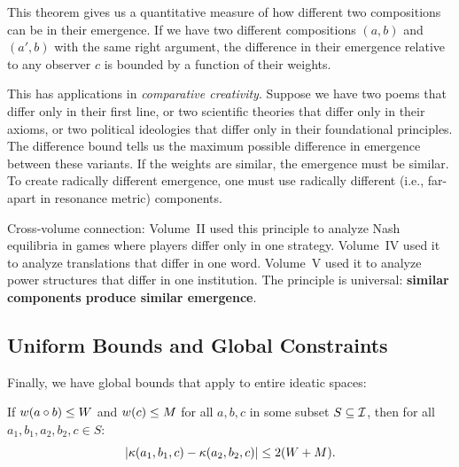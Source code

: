 \begin{interpretation}
This theorem gives us a quantitative measure of how different two compositions
can be in their emergence. If we have two different compositions $(a, b)$ and
$(a', b)$ with the same right argument, the difference in their emergence
relative to any observer $c$ is bounded by a function of their weights.

This has applications in \emph{comparative creativity}. Suppose we have two
poems that differ only in their first line, or two scientific theories that
differ only in their axioms, or two political ideologies that differ only in
their foundational principles. The difference bound tells us the maximum
possible difference in emergence between these variants. If the weights are
similar, the emergence must be similar. To create radically different
emergence, one must use radically different (i.e., far-apart in resonance
metric) components.

Cross-volume connection: Volume~II used this principle to analyze Nash
equilibria in games where players differ only in one strategy. Volume~IV used
it to analyze translations that differ in one word. Volume~V used it to
analyze power structures that differ in one institution. The principle is
universal: \textbf{similar components produce similar emergence}.
\end{interpretation}

\subsection{Uniform Bounds and Global Constraints}

Finally, we have global bounds that apply to entire ideatic spaces:

\begin{theorem}
\label{thm:uniform-bound}
If $w(a \circ b) \leq W$ and $w(c) \leq M$ for all $a, b, c$
in some subset $S \subseteq \mathcal{I}$, then for all $a_1, b_1, a_2, b_2, c \in S$:
\[
  |\kappa(a_1, b_1, c) - \kappa(a_2, b_2, c)| \leq 2(W + M).
\]
\end{theorem}

